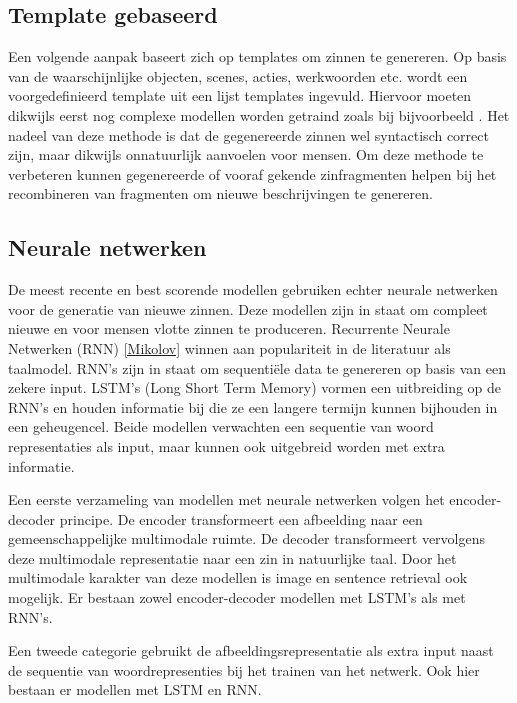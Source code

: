 \subsection{Template gebaseerd}
Een volgende aanpak baseert zich op templates om zinnen te genereren. Op basis van de waarschijnlijke objecten, scenes, acties, werkwoorden etc. wordt een voorgedefinieerd template uit een lijst templates ingevuld.\cite{Yang} Hiervoor moeten dikwijls eerst nog complexe modellen worden getraind zoals bij bijvoorbeeld \cite{Elliott}. Het nadeel van deze methode is dat de gegenereerde zinnen wel syntactisch correct zijn, maar dikwijls onnatuurlijk aanvoelen voor mensen. Om deze methode te verbeteren kunnen gegenereerde of vooraf gekende zinfragmenten helpen bij het recombineren van fragmenten om nieuwe beschrijvingen te genereren. \cite{Mitchell}\cite{Kuznetsova}

\subsection{Neurale netwerken}
De meest recente en best scorende modellen gebruiken echter neurale netwerken voor de generatie van nieuwe zinnen. Deze modellen zijn in staat om compleet nieuwe en voor mensen vlotte zinnen te produceren. Recurrente Neurale Netwerken (RNN) \ref{Mikolov} winnen aan populariteit in de literatuur als taalmodel. RNN's zijn in staat om sequenti\"ele data te genereren op basis van een zekere input. LSTM's (Long Short Term Memory) vormen een uitbreiding op de RNN's en houden informatie bij die ze een langere termijn kunnen bijhouden in een geheugencel. Beide modellen verwachten een sequentie van woord representaties als input, maar kunnen ook uitgebreid worden met extra informatie. \cite{Kiros}\cite{Xu Kul}\cite{Socher} 

Een eerste verzameling van modellen met neurale netwerken volgen het encoder-decoder principe.\cite{Kiros} De encoder transformeert een afbeelding naar een gemeenschappelijke multimodale ruimte. De decoder transformeert vervolgens deze multimodale representatie naar een zin in natuurlijke taal. Door het multimodale karakter van deze modellen is image en sentence retrieval ook mogelijk. Er bestaan zowel encoder-decoder modellen met LSTM's\cite{Kiros} als met RNN's\cite{Karpathy1}\cite{Mao}.

Een tweede categorie gebruikt de afbeeldingsrepresentatie als extra input naast de sequentie van 
woordrepresenties bij het trainen van het netwerk. Ook hier bestaan er modellen met LSTM \cite{Donahue} en RNN\cite{Karpathy}.


